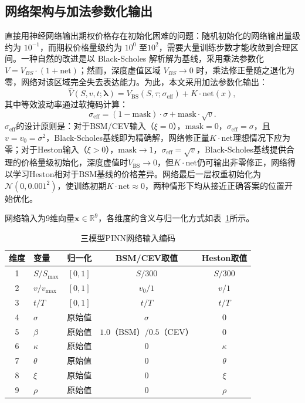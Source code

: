 \subsection{网络架构与加法参数化输出}

直接用神经网络输出期权价格存在初始化困难的问题：随机初始化的网络输出量级约为 $10^{-1}$，而期权价格量级约为 $10^0$ 至$10^2$，需要大量训练步数才能收敛到合理区间。一种自然的改进是以 Black-Scholes 解析解为基线，采用乘法参数化 $V = V_{BS}\cdot(1+\text{net})$；然而，深度虚值区域 $V_{BS}\to 0$ 时，乘法修正量随之退化为零，网络对该区域完全失去表达能力。为此，本文采用加法参数化输出：
\begin{equation}\label{eq:additive}
  \hat{V}(S,v,t;\boldsymbol{\lambda}) = V_\text{BS}(S,\tau;\sigma_\text{eff}) + K\cdot\text{net}(x),
\end{equation}
其中等效波动率通过软掩码计算：
\begin{equation}\label{eq:sigma_eff}
  \sigma_\text{eff} = (1-\text{mask})\cdot\sigma + \text{mask}\cdot\sqrt{v}.
\end{equation}
$\sigma_\text{eff}$的设计原则是：对于BSM/CEV输入（$\xi=0$），$\text{mask}=0$，$\sigma_\text{eff}=\sigma$，且$v=v_0=\sigma^2$，Black-Scholes基线即为精确解，网络修正量$K\cdot\text{net}$理想情况下应为零；对于Heston输入（$\xi>0$），$\text{mask}\to 1$，$\sigma_\text{eff}=\sqrt{v}$，Black-Scholes基线提供合理的价格量级初始化，深度虚值时$V_\text{BS}\to 0$，但$K\cdot\text{net}$仍可输出非零修正，网络得以学习Heston相对于BSM基线的价格差异。网络最后一层权重初始化为$\mathcal{N}(0,0.001^2)$，使训练初期$K\cdot\text{net}\approx 0$，两种情形下均从接近正确答案的位置开始优化。

网络输入为9维向量$\mathbf{x}\in\mathbb{R}^9$，各维度的含义与归一化方式如表~\ref{tab:input_encoding}所示。

\begin{table}[htbp]
  \centering
  \caption{三模型PINN网络输入编码}
  \label{tab:input_encoding}
  \begin{tabular}{clccc}
    \hline
    维度 & 变量 & 归一化 & BSM/CEV取值 & Heston取值 \\
    \hline
    1 & $S/S_\text{max}$ & $[0,1]$ & $S/300$ & $S/300$ \\
    2 & $v/v_\text{max}$ & $[0,1]$ & $v_0/1$ & $v/1$ \\
    3 & $t/T$            & $[0,1]$ & $t/T$   & $t/T$ \\
    4 & $\sigma$         & 原始值  & $\sigma$ & $0$ \\
    5 & $\beta$          & 原始值  & $1.0$（BSM）/$0.5$（CEV） & $0$ \\
    6 & $\kappa$         & 原始值  & $0$     & $\kappa$ \\
    7 & $\theta$         & 原始值  & $0$     & $\theta$ \\
    8 & $\xi$            & 原始值  & $0$     & $\xi$ \\
    9 & $\rho$           & 原始值  & $0$     & $\rho$ \\
    \hline
  \end{tabular}
\end{table}

